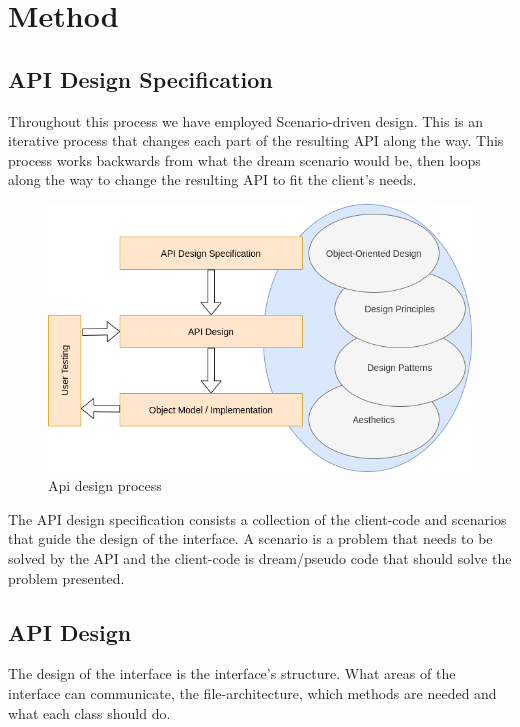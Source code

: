 \documentclass[12pt]{article}
\begin{document}
\newpage

\section{Method}

    \subsection{API Design Specification}

    Throughout this process we have employed Scenario-driven design. This is an iterative process that changes each part of the resulting API along the way. This process works backwards from what the dream scenario would be, then loops along the way to change the resulting API to fit the client’s needs.
    
    \begin{figure}[H]
        \centering
        \includegraphics[scale=0.5]{images/api-design-process.png}
        \caption{Api design process}
    \end{figure}

    The API design specification consists a collection of the client-code and scenarios that guide the design of the interface. A scenario is a problem that needs to be solved by the API and the client-code is dream/pseudo code that should solve the problem presented.

    \subsection{API Design}

    The design of the interface is the interface’s structure. What areas of the interface can communicate, the file-architecture, which methods are needed and what each class should do. 
\end{document}
